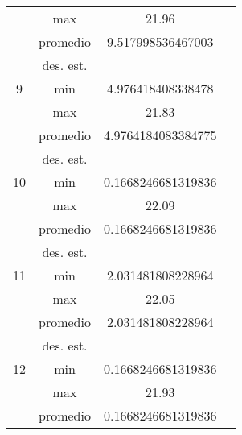 \documentclass{report}
\begin{document}
\begin{table}[ht]
\begin{tabular}{|c|c|c|c|}
                              & max                         &     21.96       &        \\ \cline{2-4} 
                              & promedio                    &     9.517998536467003       &        \\ \cline{2-4} 
                              & des. est.                   &            &        \\ \hline
        9                     & min                         &      4.976418408338478      &        \\ \cline{2-4} 
                              & max                         &      21.83      &        \\ \cline{2-4} 
                              & promedio                    &     4.9764184083384775       &        \\ \cline{2-4} 
                              & des. est.                   &            &        \\ \hline
        10                    & min                         &      0.1668246681319836      &        \\ \cline{2-4} 
                              & max                         &      22.09      &        \\ \cline{2-4} 
                              & promedio                    &      0.1668246681319836      &        \\ \cline{2-4} 
                              & des. est.                   &            &        \\ \hline
        11                    & min                         &      2.031481808228964      &        \\ \cline{2-4} 
                              & max                         &     22.05       &        \\ \cline{2-4} 
                              & promedio                    &       2.031481808228964     &        \\ \cline{2-4} 
                              & des. est.                   &            &        \\ \hline
        12                    & min                         &     0.1668246681319836       &        \\ \cline{2-4} 
                              & max                         &       21.93     &        \\ \cline{2-4} 
                              & promedio                    &      0.1668246681319836      &        \\ \cline{2-4} 

\end{tabular}
\end{table}
\end{document}
